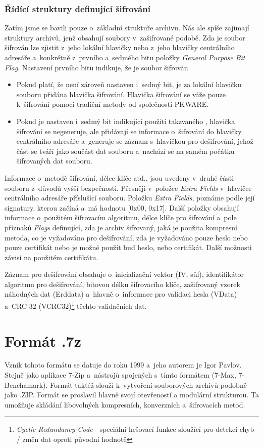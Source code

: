 \subsubsection{Řídící struktury definující šifrování}
 Zatím jsme se bavili pouze o~základní struktuře archivu. Nás ale spíše zajímají struktury
archivů, jenž obsahují soubory v~zašifrované podobě. Zda je soubor šifrován lze zjistit z~jeho
lokální hlavičky nebo z~jeho hlavičky centrálního adresáře a~konkrétně z~prvního a~sedmého bitu
položky {\it General Purpose Bit Flag}. Nastavení prvního bitu indikuje, že je soubor šifrován.
\begin{itemize}
    \item Pokud platí, že není zároveň nastaven i~sedmý bit, je za lokální hlavičku souboru
        přidána hlavička šifrování. Hlavička šifrování se váže pouze k~šifrování pomocí tradiční
        metody od společnosti PKWARE.
    \item Pokud je nastaven i~sedmý bit indikující použití takzvaného , hlavička šifrování se negeneruje, ale přidávají se informace o~šifrování do
        hlavičky centrálního adresáře a~generuje se záznam s~hlavičkou pro dešifrování, jehož
	část se tváří jako součást dat souboru a~nachází se na samém počátku šifrovaných dat
	souboru.
\end{itemize}
Informace o~metodě šifrování, délce klíče atd., jsou uvedeny v~druhé části souboru
z~důvodů vyšší bezpečnosti. Přesněji v~položce {\it Extra Fields} v~hlavičce centrálního adresáře
příslušící souboru. Položku {\it Extra Fields}, poznáme podle její signatury, kterou začíná a~má
hodnotu [0x00, 0x17]. Další položky obsahují informace o~použitém šifrovacím algoritmu, délce
klíče pro šifrování a~pole příznaků {\it Flags} definující, zda je archiv šifrovaný, jaká je
použita kompresní metoda, co je vyžadováno pro dešifrování, zda je vyžadováno pouze heslo nebo
pouze certifikát nebo je možné použít buď heslo, nebo certifikát. Další možnosti závisí na použitém
certifikátu.

 Záznam pro dešifrování obsahuje o~inicializační vektor (IV, sůl), identifikátor algoritmu pro
dešifrování, bitovou délku šifrovacího klíče, zašifrovaný vzorek náhodných dat (Erddata) a~hlavně
o~informace pro validaci hesla (VData) a~CRC-32 (VCRC32)\footnote{{\it Cyclic Redundancy Code} -
speciální hešovací funkce sloužící pro detekci chyb / změn dat oproti původní hodnotě} těchto
validačních dat. 

\section{Formát .7z}
\label{sec:7z}
Vznik tohoto formátu se datuje do roku 1999 a~jeho autorem je Igor Pavlov. Stejně jako aplikace
7-Zip a~nástrojů spojených s~tímto formátem (7-Max, 7-Benchamark). Formát taktéž slouží
k~vytvoření souborových archivů podobně jako .ZIP. Formát se proslavil hlavně svojí otevřeností a
modulární strukturou. Ta umožňuje skládání libovolných kompresních, konverzních a~šifrovacích
metod.

